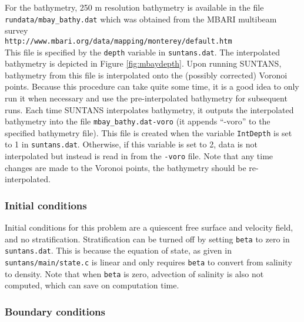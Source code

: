 For the bathymetry, 250 m resolution bathymetry is available in the file \\
\verb+rundata/mbay_bathy.dat+ which was obtained from the MBARI multibeam survey \\
\verb+http://www.mbari.org/data/mapping/monterey/default.htm+\\
This file is specified by the \verb+depth+ variable in \verb+suntans.dat+.
The interpolated bathymetry is depicted in Figure \ref{fig:mbaydepth}.
Upon running SUNTANS, bathymetry from this file is interpolated onto the (possibly corrected) Voronoi points.
Because this procedure can take quite some time, it is a good idea to only run it when necessary and use
the pre-interpolated bathymetry for subsequent runs.  Each time SUNTANS interpolates bathymetry, it outputs
the interpolated bathymetry into the file \verb+mbay_bathy.dat-voro+ (it appends ``-voro'' to the specified
bathymetry file).  This file is created when the variable \verb+IntDepth+ is set to 1 in \verb+suntans.dat+.
Otherwise, if this variable is set to 2, data is not interpolated but instead is read in from the \verb+-voro+ file.
Note that any time changes are made to the Voronoi points, the bathymetry should be re-interpolated. 

\subsubsection{Initial conditions}

Initial conditions for this problem are a quiescent free surface and velocity field, and no stratification.  
Stratification can be turned off by setting \verb+beta+ to zero in \verb+suntans.dat+.  This is because the equation
of state, as given in \verb+suntans/main/state.c+ is linear and only requires \verb+beta+ to convert from
salinity to density.  Note that when \verb+beta+ is zero, advection of salinity is also not computed, which can
save on computation time.

\subsubsection{Boundary conditions} \label{sec:tides_bc}

